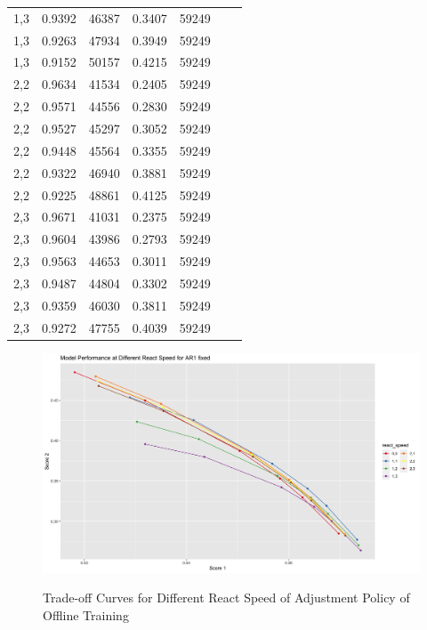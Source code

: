 \documentclass{article}
\begin{document}
\begin{longtable}[htbp]{l|l|l|*{4}{c}}
  1,3 & 0.9392 & 46387 & 0.3407 & 59249\\
  1,3 & 0.9263 & 47934 & 0.3949 & 59249\\
  1,3 & 0.9152 & 50157 & 0.4215 & 59249\\
  2,2 & 0.9634 & 41534 & 0.2405 & 59249\\
  2,2 & 0.9571 & 44556 & 0.2830 & 59249\\
  2,2 & 0.9527 & 45297 & 0.3052 & 59249\\
  2,2 & 0.9448 & 45564 & 0.3355 & 59249\\
  2,2 & 0.9322 & 46940 & 0.3881 & 59249\\
  2,2 & 0.9225 & 48861 & 0.4125 & 59249\\
  2,3 & 0.9671 & 41031 & 0.2375 & 59249\\
  2,3 & 0.9604 & 43986 & 0.2793 & 59249\\
  2,3 & 0.9563 & 44653 & 0.3011 & 59249\\
  2,3 & 0.9487 & 44804 & 0.3302 & 59249\\
  2,3 & 0.9359 & 46030 & 0.3811 & 59249\\
  2,3 & 0.9272 & 47755 & 0.4039 & 59249\\
\end{longtable}

\begin{figure}
    \caption{Trade-off Curves for Different React Speed of Adjustment Policy of Offline Training}
    \centering
    \includegraphics{images/ModelPerformanceatDifferentReactSpeedforAR1fixed.png}
    \label{fig:fig1.8.2}
\end{figure}
\end{document}
